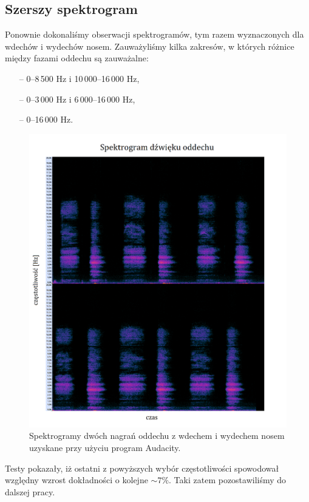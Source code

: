 \documentclass[polish]{article}
\begin{document}
\subsection{Szerszy spektrogram}
Ponownie dokonaliśmy obserwacji spektrogramów, tym razem wyznaczonych dla wdechów i wydechów nosem. Zauważyliśmy kilka zakresów, w których różnice między fazami oddechu są zauważalne:
\begin{itemize}
	\setlength\itemsep{-0.25em}
	\item[--] 0--8\,500 \unit{Hz} i 10\,000--16\,000 \unit{Hz},
	\item[--] 0--3\,000 \unit{Hz} i 6\,000--16\,000 \unit{Hz},
	\item[--] 0--16\,000 \unit{Hz}.
\end{itemize}
\begin{figure}[H]
	\centering
	\includegraphics[width=13cm]{spektrogram_wydech_nosem}
	\caption{Spektrogramy dwóch nagrań oddechu z wdechem i wydechem nosem uzyskane przy użyciu program Audacity.}
\end{figure}
Testy pokazały, iż ostatni z powyższych wybór częstotliwości spowodował względny wzrost dokładności o kolejne $\sim7\%$. Taki zatem pozostawiliśmy do dalszej pracy.
\end{document}
